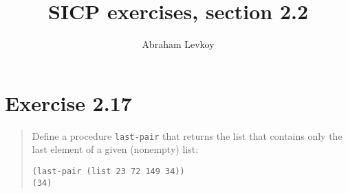 \documentclass{article}
\author{Abraham Levkoy}
\title{SICP exercises, section 2.2}
\begin{document}
\maketitle

\section{Exercise 2.17}
\begin{quote}
    Define a procedure \texttt{last-pair} that returns the list that contains
    only the last element of a given (nonempty) list:
    \begin{lstlisting}
(last-pair (list 23 72 149 34))
(34)
    \end{lstlisting}
\end{quote}


\end{document}
